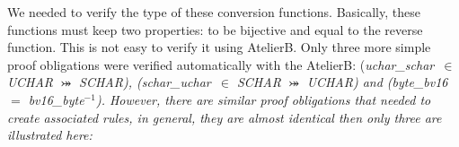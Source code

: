 We needed to verify the type of these conversion functions. %
Basically, these functions must keep two properties: to be bijective and equal to the reverse function.  This is not easy to verify it using AtelierB. Only three more simple proof obligations were verified automatically with the AtelierB: (\it uchar\_schar\rm \ $\in$ \textit{UCHAR} $\bij$ \textit{SCHAR}), (\it schar\_uchar\rm \ $\in$ \textit{SCHAR} $\bij$ \textit{UCHAR}) and (\it byte\_bv16\rm \ $=$ \it bv16\_byte\rm $^{-1}$).
%
%
However, there are similar proof obligations that needed to create associated rules, in general, they are almost identical then only three are illustrated here:


